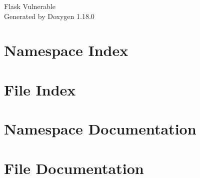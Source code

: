 \documentclass[twoside]{book}
\newcommand{\+}{\discretionary{\mbox{\scriptsize$\hookleftarrow$}}{}{}}
\newcommand{\clearemptydoublepage}{%
    \newpage{\pagestyle{empty}\cleardoublepage}%
  }
\begin{document}
  \raggedbottom
    \hypersetup{pageanchor=false,
                bookmarksnumbered=true,
                pdfencoding=unicode
               }
  \begin{titlepage}
  \vspace*{7cm}
  \begin{center}%
  {\Large Flask Vulnerable}\\
  \vspace*{1cm}
  {\large Generated by Doxygen 1.18.0}\\
  \end{center}
  \end{titlepage}
  \clearemptydoublepage
  \tableofcontents
  \clearemptydoublepage
  \hypersetup{pageanchor=true}
\chapter{Namespace Index}

\chapter{File Index}

\chapter{Namespace Documentation}

\chapter{File Documentation}

  \backmatter
  \newpage
  \clearemptydoublepage
  \printindex
\end{document}
